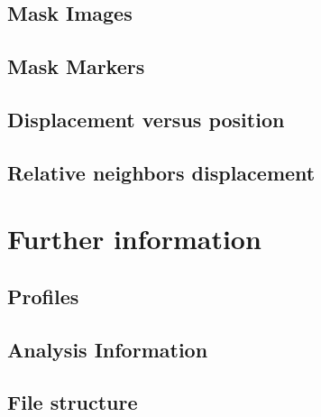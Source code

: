 \documentclass{article}
\begin{document}
  \newpage
  \subsection{Mask Images}
  \label{sub:Mask Images}
    \vspace{.2cm}
    

  \newpage
  \subsection{Mask Markers}
  \label{sub:Mask Markers}
    \vspace{.2cm}
    

  \newpage
  \subsection{Displacement versus position}
  \label{sub:Displacement versus position}
    \vspace{.2cm}
    

  \newpage
  \subsection{Relative neighbors displacement}
  \label{subs:Relative neighbors displacement}
    \vspace{.2cm}
    

\newpage
\section{Further information}
\label{sec:Further information}
\vspace{.5cm}

  \subsection{Profiles}
  \label{sub:Profiles}
    \vspace{.2cm}
    

  \newpage
  \subsection{Analysis Information}
  \label{sub:Analysis Information}
    \vspace{.2cm}
    

  \subsection{File structure}
  \label{sub:File structure}
    \vspace{.2cm}
    
\end{document}
